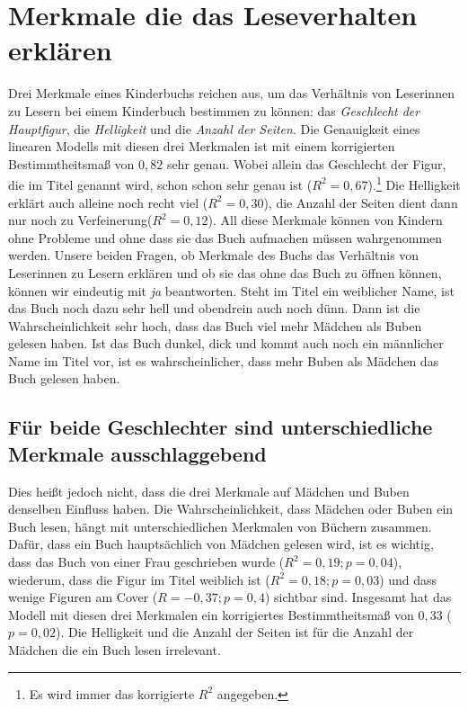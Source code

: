 \chapter{Merkmale die das Leseverhalten erklären}

Drei Merkmale eines Kinderbuchs reichen aus, um das Verhältnis von
Leserinnen zu Lesern bei einem Kinderbuch bestimmen zu können: das
\emph{Geschlecht der Hauptfigur}, die \emph{Helligkeit} und die
\emph{Anzahl der Seiten}. Die Genauigkeit eines linearen Modells mit
diesen drei Merkmalen ist mit einem korrigierten Bestimmtheitsmaß von
$0{,}82$ sehr genau. Wobei allein das Geschlecht der Figur, die im Titel
genannt wird, schon schon sehr genau ist
($R^2=0{,}67$).\footnote{Es wird immer das korrigierte $R^2$ angegeben.}
Die Helligkeit erklärt auch alleine noch recht viel ($R^2=0{,}30$), die
Anzahl der Seiten dient dann nur noch zu Verfeinerung($R^2=0{,}12$). All
diese Merkmale können von Kindern ohne Probleme und ohne dass sie das
Buch aufmachen müssen wahrgenommen werden. Unsere beiden Fragen, ob
Merkmale des Buchs das Verhältnis von Leserinnen zu Lesern erklären und
ob sie das ohne das Buch zu öffnen können, können wir eindeutig mit
\emph{ja} beantworten. Steht im Titel ein weiblicher Name, ist das Buch
noch dazu sehr hell und obendrein auch noch dünn. Dann ist die
Wahrscheinlichkeit sehr hoch, dass das Buch viel mehr Mädchen als Buben
gelesen haben. Ist das Buch dunkel, dick und kommt auch noch ein
männlicher Name im Titel vor, ist es wahrscheinlicher, dass mehr Buben
als Mädchen das Buch gelesen haben.

\section{Für beide Geschlechter sind unterschiedliche Merkmale
ausschlaggebend}

Dies heißt jedoch nicht, dass die drei Merkmale auf Mädchen und Buben
denselben Einfluss haben. Die Wahrscheinlichkeit, dass Mädchen oder
Buben ein Buch lesen, hängt mit unterschiedlichen Merkmalen von Büchern
zusammen. Dafür, dass ein Buch hauptsächlich von Mädchen gelesen wird,
ist es wichtig, dass das Buch von einer Frau geschrieben wurde
($R^2=0{,}19; p=0{,}04$), wiederum, dass die Figur im Titel weiblich ist
($R^2=0{,}18; p=0{,}03$) und dass wenige Figuren am Cover
($R=-0{,}37; p=0{,}4$) sichtbar sind. Insgesamt hat das Modell mit
diesen drei Merkmalen ein korrigiertes Bestimmtheitsmaß von $0{,}33$
($p=0{,}02$). Die Helligkeit und die Anzahl der Seiten ist für die
Anzahl der Mädchen die ein Buch lesen irrelevant.

